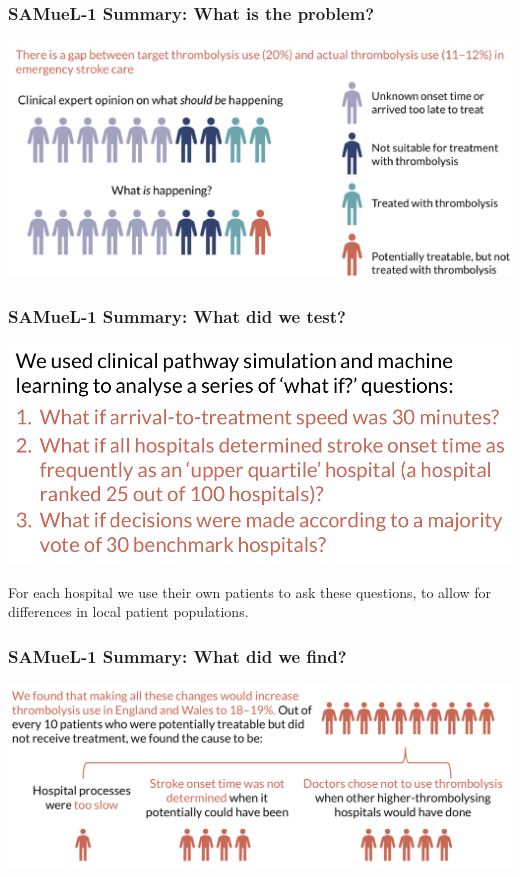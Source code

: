 \documentclass{beamer}
\begin{document}

\begin{frame}
\frametitle{SAMueL-1 Summary: What is the problem?}
\begin{center}
\includegraphics[width=1.0\textwidth]{./images/sam_summary_pt_1}
\end{center}
\end{frame}

\begin{frame}
\frametitle{SAMueL-1 Summary: What did we test?}
\begin{center}
\includegraphics[width=1.0\textwidth]{./images/sam_summary_pt_2}
\end{center}

For each hospital we use their own patients to ask these questions, to allow for differences in local patient populations.
\end{frame}

\begin{frame}
\frametitle{SAMueL-1 Summary: What did we find?}
\begin{center}
\includegraphics[width=1.0\textwidth]{./images/sam_summary_pt_3}
\end{center}
\end{frame}
\end{document}
